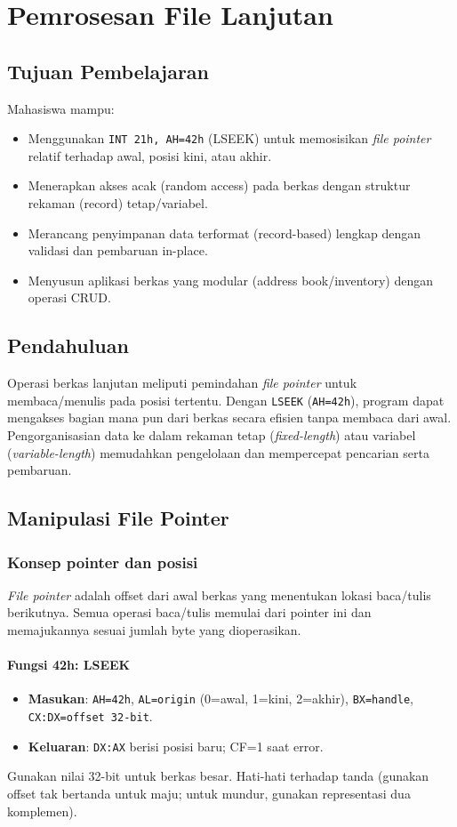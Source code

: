\chapter{Pemrosesan File Lanjutan}

\section{Tujuan Pembelajaran}
Mahasiswa mampu:
\begin{itemize}
    \item Menggunakan \texttt{INT 21h, AH=42h} (LSEEK) untuk memosisikan \textit{file pointer} relatif terhadap awal, posisi kini, atau akhir.
    \item Menerapkan akses acak (random access) pada berkas dengan struktur rekaman (record) tetap/variabel.
    \item Merancang penyimpanan data terformat (record-based) lengkap dengan validasi dan pembaruan in-place.
    \item Menyusun aplikasi berkas yang modular (address book/inventory) dengan operasi CRUD.
\end{itemize}

\section{Pendahuluan}
Operasi berkas lanjutan meliputi pemindahan \textit{file pointer} untuk membaca/menulis pada posisi tertentu. Dengan \texttt{LSEEK} (\texttt{AH=42h}), program dapat mengakses bagian mana pun dari berkas secara efisien tanpa membaca dari awal. Pengorganisasian data ke dalam rekaman tetap (\textit{fixed-length}) atau variabel (\textit{variable-length}) memudahkan pengelolaan dan mempercepat pencarian serta pembaruan.

\section{Manipulasi File Pointer}
\subsection{Konsep pointer dan posisi}
\textit{File pointer} adalah offset dari awal berkas yang menentukan lokasi baca/tulis berikutnya. Semua operasi baca/tulis memulai dari pointer ini dan memajukannya sesuai jumlah byte yang dioperasikan.

\subsubsection{Fungsi 42h: LSEEK}
\begin{itemize}
  \item \textbf{Masukan}: \texttt{AH=42h}, \texttt{AL=origin} (0=awal, 1=kini, 2=akhir), \texttt{BX=handle}, \texttt{CX:DX=offset 32-bit}.
  \item \textbf{Keluaran}: \texttt{DX:AX} berisi posisi baru; CF=1 saat error.
\end{itemize}
Gunakan nilai 32-bit untuk berkas besar. Hati-hati terhadap tanda (gunakan offset tak bertanda untuk maju; untuk mundur, gunakan representasi dua komplemen).

